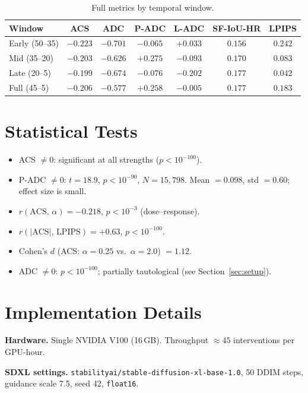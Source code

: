 \documentclass{article}
\begin{document}
\begin{table}[h]
\centering
\caption{Full metrics by temporal window.}
\small
\begin{tabular}{@{}lcccccc@{}}
\toprule
Window & ACS & ADC & P-ADC & L-ADC & SF-IoU-HR & LPIPS \\
\midrule
Early (50--35) & $-0.223$ & $-0.701$ & $-0.065$ & $+0.033$ & $0.156$ & $0.242$ \\
Mid   (35--20) & $-0.203$ & $-0.626$ & $+0.275$ & $-0.093$ & $0.170$ & $0.083$ \\
Late  (20--5)  & $-0.199$ & $-0.674$ & $-0.076$ & $-0.202$ & $0.177$ & $0.042$ \\
Full  (45--5)  & $-0.206$ & $-0.577$ & $+0.258$ & $-0.005$ & $0.177$ & $0.183$ \\
\bottomrule
\end{tabular}
\end{table}

\section{Statistical Tests}
\label{app:stats}

\begin{itemize}[leftmargin=1.5em]
  \item ACS $\neq 0$: significant at all strengths ($p < 10^{-100}$).
  \item P-ADC $\neq 0$: $t=18.9$,\; $p < 10^{-90}$,\; $N=15{,}798$.
        Mean $= 0.098$, std $= 0.60$; effect size is small.
  \item $r(\text{ACS},\,\alpha) = -0.218$,\; $p < 10^{-3}$
        (dose--response).
  \item $r(|\text{ACS}|,\,\text{LPIPS}) = +0.63$,\; $p < 10^{-100}$.
  \item Cohen's $d$ (ACS: $\alpha\!=\!0.25$ vs.\ $\alpha\!=\!2.0$)
        $= 1.12$.
  \item ADC $\neq 0$: $p < 10^{-100}$; partially tautological
        (see Section~\ref{sec:setup}).
\end{itemize}

\section{Implementation Details}
\label{app:impl}

\noindent\textbf{Hardware.}
Single NVIDIA V100 (16\,GB). Throughput $\approx 45$ interventions
per GPU-hour.

\noindent\textbf{SDXL settings.}
\texttt{stabilityai/stable-diffusion-xl-base-1.0}, 50 DDIM steps,
guidance scale 7.5, seed 42, \texttt{float16}.
\end{document}

